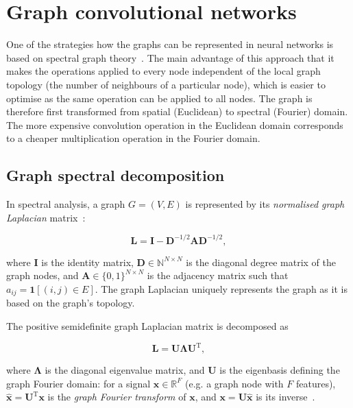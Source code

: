 \section{Graph convolutional networks}
\label{training-gcn}

One of the strategies how the graphs can be represented in neural networks is based on spectral graph theory~\cite{hammond2011wavelets}. The main advantage of this approach that it makes the operations applied to every node independent of the local graph topology (the number of neighbours of a particular node), which is easier to optimise as the same operation can be applied to all nodes. The graph is therefore first transformed from spatial (Euclidean) to spectral (Fourier) domain. The more expensive convolution operation in the Euclidean domain corresponds to a cheaper multiplication operation in the Fourier domain.

\subsection{Graph spectral decomposition}

In spectral analysis, a graph $G = (V, E)$ is represented by its \textit{normalised graph Laplacian} matrix~\cite{defferrard2016convolutional}: 

\begin{equation}
    \mathbf{L} = \mathbf{I} - \mathbf{D}^{-1/2}\mathbf{A}\mathbf{D}^{-1/2},
\end{equation}

where $\mathbf{I}$ is the identity matrix, $\mathbf{D} \in \mathbb{N}^{N \times N}$ is the diagonal degree matrix of the graph nodes, and $\mathbf{A} \in \{0, 1\}^{N \times N}$ is the adjacency matrix such that $a_{ij} = \mathbf{1}[(i, j) \in E]$. The graph Laplacian uniquely represents the graph as it is based on the graph's topology.

The positive semidefinite graph Laplacian matrix is decomposed as

\begin{equation}
    \mathbf{L} = \mathbf{U\Lambda U}^\mathrm{T},
\end{equation}

where $\mathbf{\Lambda}$ is the diagonal eigenvalue matrix, and $\mathbf{U}$ is the eigenbasis defining the graph Fourier domain: for a signal $\mathbf{x} \in \mathbb{R}^{F}$ (e.g. a graph node with $F$ features), $\mathbf{\hat{x}} = \mathbf{U}^\mathrm{T}\mathbf{x}$ is the \textit{graph Fourier transform} of $\mathbf{x}$, and $\mathbf{x} = \mathbf{U}\mathbf{\hat{x}}$ is its inverse~\cite{wu2019simplifying}.

